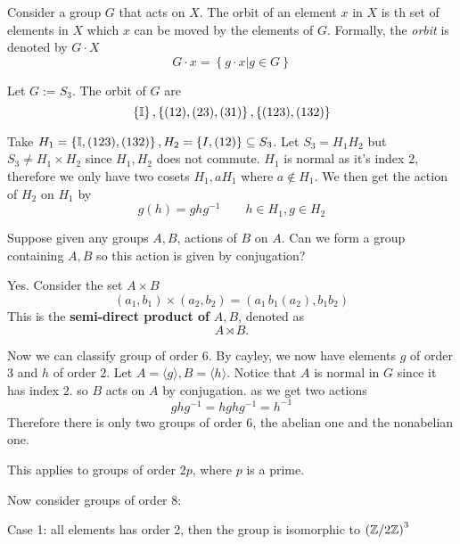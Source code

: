 \begin{definition}
	Consider a group $G$ that acts on $X$. The orbit of an element $x$ in $X$ is th set of elements in $X$ which $x$ can be moved by the elements of $G$. Formally, the \textit{orbit} is denoted by $G \cdot X$
	\[ G \cdot x = \left\{ g \cdot x | g \in G \right\}\]
\end{definition}
\begin{example}
	Let $G := S_3$. The orbit of $G$ are
	\[ \left\{ \mathbb I \right\}, \left\{ (12), (23), (31) \right\}, \left\{ (123), (132) \right\}\]
\end{example}
\begin{example}
	Take $H_1 = \left\{ \mathbb I, (123), (132) \right\}, H_2 = \left\{ I, (12) \right\} \subseteq S_3$. Let $S_3 = H_1H_2$ but $S_3 \neq H_1 \times H_2$ since $H_1, H_2$ does not commute. $H_1$ is normal as it's index $2$, therefore we only have two cosets $H_1,aH_1$ where $a \not\in H_1$. We then get the action of $H_2$ on $H_1$ by
	\[ g(h) = ghg^{-1} \qquad h \in H_1, g \in H_2\]
\end{example}
\begin{question}
	Suppose given any groups $A,B$, actions of $B$ on $A$. Can we form a group containing $A,B$ so this action is given by conjugation?
\end{question}
\begin{answer}
	Yes. Consider the set $A \times B$
	\[ (a_1, b_1) \times (a_2, b_2) = (a_1 \, b_1(a_2), b_1b_2)\]
	This is the \textbf{semi-direct product of} $A,B$, denoted as
	\[ A \rtimes B.\]
\end{answer}
Now we can classify group of order $6$. By cayley, we now have elements $g$ of order $3$ and $h$ of order $2$. Let $A = \langle g \rangle, B = \langle h \rangle$. Notice that $A$ is normal in $G$ since it has index $2$. so $B$ acts on $A$ by conjugation. as we get two actions
\[ ghg^{-1} = hghg^{-1} = h^{-1}\]  
Therefore there is only two groups of order $6$, the abelian one and the nonabelian one.
\begin{remark}
	This applies to groups of order $2p$, where $p$ is a prime.
\end{remark}
Now consider groups of order $8$:

Case 1: all elements has order 2, then the group is isomorphic to $\left(\mathbb Z/ 2 \mathbb Z \right)^3$

